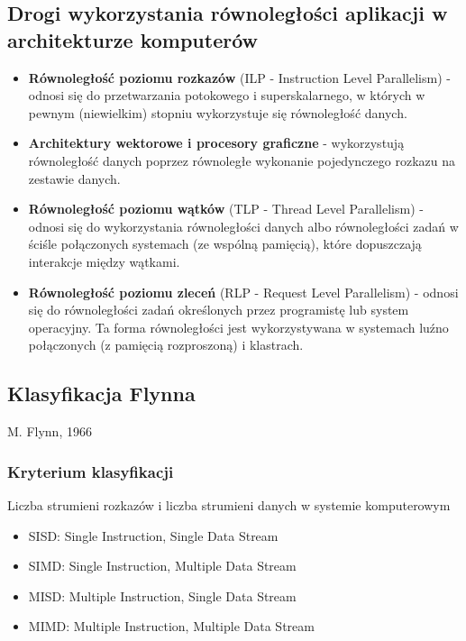 \documentclass[a4paper,twoside]{article}
\begin{document}
		\subsection*{Drogi wykorzystania równoległości aplikacji w architekturze komputerów}
			\begin{itemize}
				\item \textbf{Równoległość poziomu rozkazów} (ILP - Instruction Level Parallelism) - odnosi się do przetwarzania potokowego i superskalarnego, w których w pewnym (niewielkim) stopniu wykorzystuje się równoległość danych.
				\item \textbf{Architektury wektorowe i procesory graficzne} - wykorzystują równoległość danych poprzez równoległe wykonanie pojedynczego rozkazu na zestawie danych.
				\item \textbf{Równoległość poziomu wątków} (TLP - Thread Level Parallelism) - odnosi się do wykorzystania równoległości danych albo równoległości zadań w ściśle połączonych systemach (ze wspólną pamięcią), które dopuszczają interakcje między wątkami.
				\item \textbf{Równoległość poziomu zleceń} (RLP - Request Level Parallelism) - odnosi się do równoległości zadań określonych przez programistę lub system operacyjny. Ta forma równoległości jest wykorzystywana w systemach luźno połączonych (z pamięcią rozproszoną) i klastrach.
			\end{itemize}
			
		\subsection*{Klasyfikacja Flynna}
		M. Flynn, 1966
		\subsubsection*{Kryterium klasyfikacji}
		Liczba strumieni rozkazów i liczba strumieni danych w systemie komputerowym
		\begin{itemize}
			\item SISD: Single Instruction, Single Data Stream
			\item SIMD: Single Instruction, Multiple Data Stream
			\item MISD: Multiple Instruction, Single Data Stream
			\item MIMD: Multiple Instruction, Multiple Data Stream
		\end{itemize}
\end{document}
